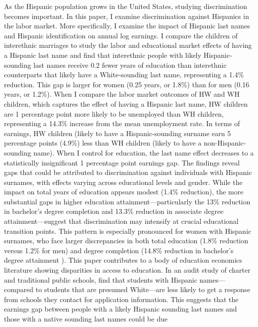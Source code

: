 As the Hispanic population grows in the United States, studying discrimination becomes important. In this paper, I examine discrimination against Hispanics in the labor market. More specifically, I examine the impact of Hispanic last names and Hispanic identification on annual log earnings.
I compare the children of interethnic marriages to study the labor and educational market effects of having a Hispanic last name and find that interethnic people with likely Hispanic-sounding last names receive 0.2 fewer years of education than interethnic counterparts that likely have a White-sounding  last name, representing a 1.4\% reduction. This gap is larger for women (0.25 years, or 1.8\%) than for men (0.16 years, or 1.2\%). When I compare the labor market outcomes of HW and WH children, which captures the effect of having a Hispanic last name, HW children are 1 percentage point more likely to be unemployed than WH children, representing a 14.3\% increase from the mean unemployment rate. In terms of earnings, HW children (likely to have a Hispanic-sounding surname earn 5 percentage points (4.9\%) less than WH children (likely to have a non-Hispanic-sounding name). When I control for education, the last name effect decreases to a statistically insignificant 1 percentage point earnings gap.
The findings reveal gaps that could be attributed to discrimination against individuals with Hispanic surnames, with effects varying across educational levels and gender. While the impact on total years of education appears modest (1.4\% reduction), the more substantial gaps in higher education attainment—particularly the 13\% reduction in bachelor’s degree completion and 13.3\% reduction in associate degree attainment—suggest that discrimination may intensify at crucial educational transition points. This pattern is especially pronounced for women with Hispanic surnames, who face larger discrepancies in both total education (1.8\% reduction versus 1.2\% for men) and degree completion (14.8\% reduction in bachelor’s degree attainment ).
This paper contributes to a body of education economics literature showing disparities in access to education. In an audit study of charter and traditional public schools, \textcite{bergman2018education,gaddis2024racial} find that students  with Hispanic names—compared to students that are presumed White—are less likely to get a response from schools they contact for application information. This suggests that the earnings gap between people with a likely Hispanic sounding last names and those with a native  sounding last names could be due
 
